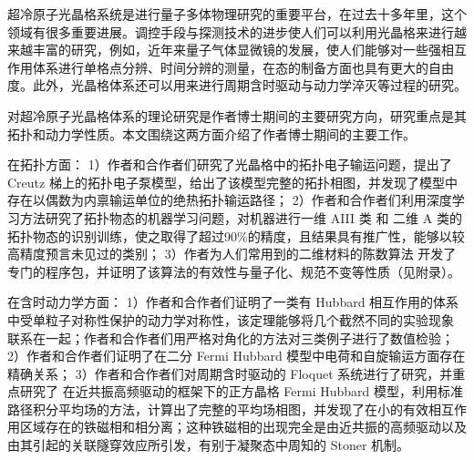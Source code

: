 \begin{cabstract}
超冷原子光晶格系统是进行量子多体物理研究的重要平台，在过去十多年里，这个领域有很多重要进展。调控手段与探测技术的进步使人们可以利用光晶格来进行越来越丰富的研究，例如，近年来量子气体显微镜的发展，使人们能够对一些强相互作用体系进行单格点分辨、时间分辨的测量，在态的制备方面也具有更大的自由度。此外，光晶格体系还可以用来进行周期含时驱动与动力学淬灭等过程的研究。

对超冷原子光晶格体系的理论研究是作者博士期间的主要研究方向，研究重点是其拓扑和动力学性质。本文围绕这两方面介绍了作者博士期间的主要工作。

在拓扑方面：
1）作者和合作者们研究了光晶格中的拓扑电子输运问题，提出了 Creutz 梯上的拓扑电子泵模型，给出了该模型完整的拓扑相图，并发现了模型中存在以偶数为内禀输运单位的绝热拓扑输运路径；
2）作者和合作者们利用深度学习方法研究了拓扑物态的机器学习问题，对机器进行一维 AIII 类 和 二维 A 类的拓扑物态的识别训练，使之取得了超过90\%的精度，且结果具有推广性，能够以较高精度预言未见过的类别；
3）作者为人们常用到的二维材料的陈数算法%
开发了专门的程序包，并证明了该算法的有效性与量子化、规范不变等性质（见附录）。

在含时动力学方面：
1）作者和合作者们证明了一类有 Hubbard 相互作用的体系中受单粒子对称性保护的动力学对称性，该定理能够将几个截然不同的实验现象
联系在一起；作者和合作者们用严格对角化的方法对三类例子进行了数值检验；
2）作者和合作者们证明了在二分 Fermi Hubbard 模型中电荷和自旋输运方面存在精确关系；
3）作者和合作者们对周期含时驱动的 Floquet 系统进行了研究，并重点研究了
在近共振高频驱动的框架下的正方晶格 Fermi Hubbard 模型，利用标准路径积分平均场的方法，计算出了完整的平均场相图，并发现了在小的有效相互作用区域存在的铁磁相和相分离；这种铁磁相的出现完全是由近共振的高频驱动以及由其引起的关联隧穿效应所引发，有别于凝聚态中周知的 Stoner 机制。
\end{cabstract}


